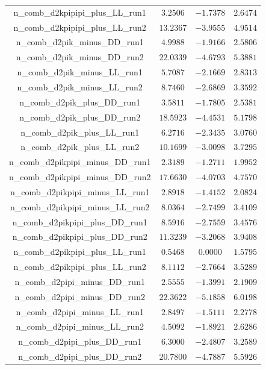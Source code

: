 \begin{table}[h]
{\begin{tabular}{cccc}
n\_comb\_d2kpipipi\_plus\_LL\_run1 & $3.2506$ & $-1.7378$ & $2.6474$ \\
n\_comb\_d2kpipipi\_plus\_LL\_run2 & $13.2367$ & $-3.9555$ & $4.9514$ \\
n\_comb\_d2pik\_minus\_DD\_run1 & $4.9988$ & $-1.9166$ & $2.5806$ \\
n\_comb\_d2pik\_minus\_DD\_run2 & $22.0339$ & $-4.6793$ & $5.3881$ \\
n\_comb\_d2pik\_minus\_LL\_run1 & $5.7087$ & $-2.1669$ & $2.8313$ \\
n\_comb\_d2pik\_minus\_LL\_run2 & $8.7460$ & $-2.6869$ & $3.3592$ \\
n\_comb\_d2pik\_plus\_DD\_run1 & $3.5811$ & $-1.7805$ & $2.5381$ \\
n\_comb\_d2pik\_plus\_DD\_run2 & $18.5923$ & $-4.4531$ & $5.1798$ \\
n\_comb\_d2pik\_plus\_LL\_run1 & $6.2716$ & $-2.3435$ & $3.0760$ \\
n\_comb\_d2pik\_plus\_LL\_run2 & $10.1699$ & $-3.0098$ & $3.7295$ \\
n\_comb\_d2pikpipi\_minus\_DD\_run1 & $2.3189$ & $-1.2711$ & $1.9952$ \\
n\_comb\_d2pikpipi\_minus\_DD\_run2 & $17.6630$ & $-4.0703$ & $4.7570$ \\
n\_comb\_d2pikpipi\_minus\_LL\_run1 & $2.8918$ & $-1.4152$ & $2.0824$ \\
n\_comb\_d2pikpipi\_minus\_LL\_run2 & $8.0364$ & $-2.7499$ & $3.4109$ \\
n\_comb\_d2pikpipi\_plus\_DD\_run1 & $8.5916$ & $-2.7559$ & $3.4576$ \\
n\_comb\_d2pikpipi\_plus\_DD\_run2 & $11.3239$ & $-3.2068$ & $3.9408$ \\
n\_comb\_d2pikpipi\_plus\_LL\_run1 & $0.5468$ & $0.0000$ & $1.5795$ \\
n\_comb\_d2pikpipi\_plus\_LL\_run2 & $8.1112$ & $-2.7664$ & $3.5289$ \\
n\_comb\_d2pipi\_minus\_DD\_run1 & $2.5555$ & $-1.3991$ & $2.1909$ \\
n\_comb\_d2pipi\_minus\_DD\_run2 & $22.3622$ & $-5.1858$ & $6.0198$ \\
n\_comb\_d2pipi\_minus\_LL\_run1 & $2.8497$ & $-1.5111$ & $2.2778$ \\
n\_comb\_d2pipi\_minus\_LL\_run2 & $4.5092$ & $-1.8921$ & $2.6286$ \\
n\_comb\_d2pipi\_plus\_DD\_run1 & $6.3000$ & $-2.4807$ & $3.2589$ \\
n\_comb\_d2pipi\_plus\_DD\_run2 & $20.7800$ & $-4.7887$ & $5.5926$ \\

\end{tabular}}
\end{table}
